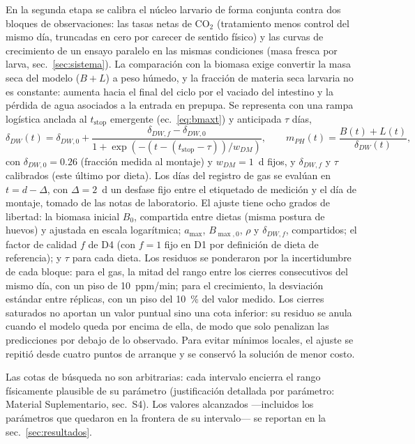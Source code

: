 En la segunda etapa se calibra el núcleo larvario de forma conjunta contra dos bloques de observaciones: las tasas netas de CO$_2$ (tratamiento menos control del mismo día, truncadas en cero por carecer de sentido físico) y las curvas de crecimiento de un ensayo paralelo en las mismas condiciones (masa fresca por larva, sec.~\ref{sec:sistema}). La comparación con la biomasa exige convertir la masa seca del modelo ($B + L$) a peso húmedo, y la fracción de materia seca larvaria no es constante: aumenta hacia el final del ciclo por el vaciado del intestino y la pérdida de agua asociados a la entrada en prepupa. Se representa con una rampa logística anclada al $t_{\mathrm{stop}}$ emergente (ec.~\ref{eq:bmaxt}) y anticipada $\tau$ días,
\begin{equation}
\delta_{DW}(t) = \delta_{DW,0} + \frac{\delta_{DW,f} - \delta_{DW,0}}{1 + \exp(-(t - (t_{\mathrm{stop}} - \tau))/w_{DM})},
\qquad
m_{PH}(t) = \frac{B(t) + L(t)}{\delta_{DW}(t)},
\label{eq:modelo_obs}
\end{equation}
con $\delta_{DW,0} = 0.26$ (fracción medida al montaje) y $w_{DM} = 1$~d fijos, y $\delta_{DW,f}$ y $\tau$ calibrados (este último por dieta). Los días del registro de gas se evalúan en $t = d - \Delta$, con $\Delta = 2$~d un desfase fijo entre el etiquetado de medición y el día de montaje, tomado de las notas de laboratorio. El ajuste tiene ocho grados de libertad: la biomasa inicial $B_0$, compartida entre dietas (misma postura de huevos) y ajustada en escala logarítmica; $a_{\max}$, $B_{\max,0}$, $\rho$ y $\delta_{DW,f}$, compartidos; el factor de calidad $f$ de D4 (con $f = 1$ fijo en D1 por definición de dieta de referencia); y $\tau$ para cada dieta. Los residuos se ponderaron por la incertidumbre de cada bloque: para el gas, la mitad del rango entre los cierres consecutivos del mismo día, con un piso de 10~ppm/min; para el crecimiento, la desviación estándar entre réplicas, con un piso del 10~\% del valor medido. Los cierres saturados no aportan un valor puntual sino una cota inferior: su residuo se anula cuando el modelo queda por encima de ella, de modo que solo penalizan las predicciones por debajo de lo observado. Para evitar mínimos locales, el ajuste se repitió desde cuatro puntos de arranque y se conservó la solución de menor costo.

Las cotas de búsqueda no son arbitrarias: cada intervalo encierra el rango físicamente plausible de su parámetro (justificación detallada por parámetro: Material Suplementario, sec.~S4). Los valores alcanzados ---incluidos los parámetros que quedaron en la frontera de su intervalo--- se reportan en la sec.~\ref{sec:resultados}.

